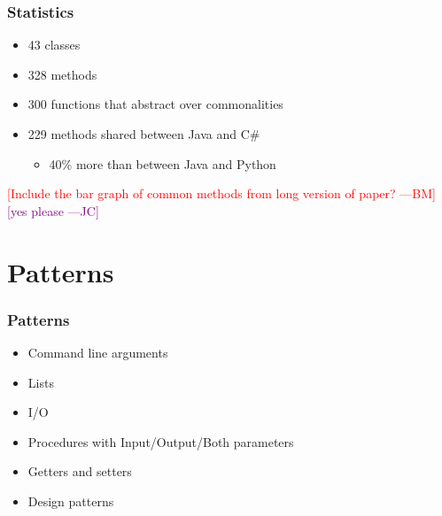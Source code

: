 \documentclass{beamer}
\newcommand{\authornote}[3]{\textcolor{#1}{[#3 ---#2]}}
\newcommand{\bmac}[1]{\authornote{red}{BM}{#1}}
\newcommand{\jc}[1]{\authornote{purple}{JC}{#1}}
\newcommand{\Csharp}{C\#}
\begin{document}

\begin{frame}

\frametitle{Statistics}

\begin{itemize}
  \item 43 classes
  \item 328 methods
  \item 300 functions that abstract over commonalities
  \item 229 methods shared between Java and \Csharp
  \begin{itemize}
      \item 40\% more than between Java and Python
  \end{itemize}
\end{itemize}

\bmac{Include the bar graph of common methods from long version of paper?}
	\jc{yes please}

\end{frame}


\section[Patterns]{Patterns}


\begin{frame}

\frametitle{Patterns}

\begin{itemize}
  \item Command line arguments
  \item Lists
  \item I/O
  \item Procedures with Input/Output/Both parameters
  \item Getters and setters
  \item Design patterns
\end{itemize}

\end{frame}

\end{document}
